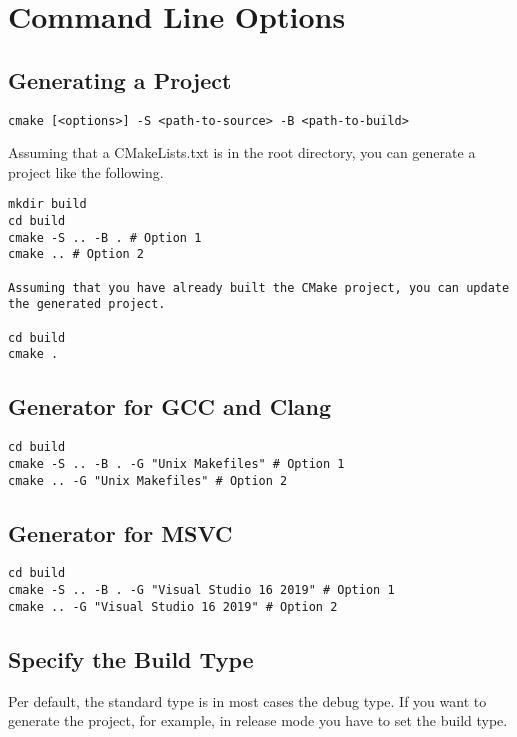 \documentclass[openany]{report}
\begin{document}
\section{Command Line Options}

\subsection{Generating a Project}

\begin{verbatim}
cmake [<options>] -S <path-to-source> -B <path-to-build>
\end{verbatim}

Assuming that a CMakeLists.txt is in the root directory, you can generate a project like the following.

\begin{verbatim}
mkdir build
cd build
cmake -S .. -B . # Option 1
cmake .. # Option 2

Assuming that you have already built the CMake project, you can update the generated project.

cd build
cmake .
\end{verbatim}

\subsection{Generator for GCC and Clang}

\begin{verbatim}
cd build
cmake -S .. -B . -G "Unix Makefiles" # Option 1
cmake .. -G "Unix Makefiles" # Option 2
\end{verbatim}

\subsection{Generator for MSVC}

\begin{verbatim}
cd build
cmake -S .. -B . -G "Visual Studio 16 2019" # Option 1
cmake .. -G "Visual Studio 16 2019" # Option 2
\end{verbatim}

\subsection{Specify the Build Type}

Per default, the standard type is in most cases the debug type.
If you want to generate the project, for example, in release mode you have to set the build type.
\end{document}
